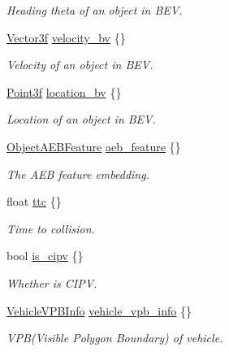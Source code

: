 \begin{DoxyCompactItemize}
\begin{DoxyCompactList}\small\item\em Heading theta of an object in B\+EV. \end{DoxyCompactList}\item 
\hyperlink{structmaf__perception__interface_1_1Vector3f}{Vector3f} \hyperlink{structmaf__perception__interface_1_1Object_a73ab1027c805920082515f2c7d8a3d41}{velocity\+\_\+bv} \{\}
\begin{DoxyCompactList}\small\item\em Velocity of an object in B\+EV. \end{DoxyCompactList}\item 
\hyperlink{structmaf__perception__interface_1_1Point3f}{Point3f} \hyperlink{structmaf__perception__interface_1_1Object_a9b8648e0191d4fcae492e3356a5d91a4}{location\+\_\+bv} \{\}
\begin{DoxyCompactList}\small\item\em Location of an object in B\+EV. \end{DoxyCompactList}\item 
\hyperlink{structmaf__perception__interface_1_1ObjectAEBFeature}{Object\+A\+E\+B\+Feature} \hyperlink{structmaf__perception__interface_1_1Object_a1358bb68ae9ab88dabfc67a8576d7182}{aeb\+\_\+feature} \{\}
\begin{DoxyCompactList}\small\item\em The A\+EB feature embedding. \end{DoxyCompactList}\item 
float \hyperlink{structmaf__perception__interface_1_1Object_ab33d2b5861c8b6c26a9e8af8a63b34f1}{ttc} \{\}
\begin{DoxyCompactList}\small\item\em Time to collision. \end{DoxyCompactList}\item 
bool \hyperlink{structmaf__perception__interface_1_1Object_a89183ecb09490234c2975d1f499aaf0a}{is\+\_\+cipv} \{\}
\begin{DoxyCompactList}\small\item\em Whether is C\+I\+PV. \end{DoxyCompactList}\item 
\hyperlink{structmaf__perception__interface_1_1VehicleVPBInfo}{Vehicle\+V\+P\+B\+Info} \hyperlink{structmaf__perception__interface_1_1Object_a846982eb56e78775ac1282f5620a1579}{vehicle\+\_\+vpb\+\_\+info} \{\}
\begin{DoxyCompactList}\small\item\em V\+P\+B(\+Visible Polygon Boundary) of vehicle. \end{DoxyCompactList}\item 

\end{DoxyCompactItemize}
